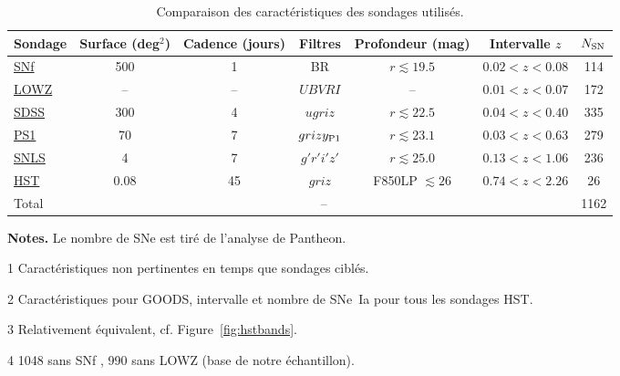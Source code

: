 \documentclass[../main/main.tex]{subfiles}
\begin{document}
\begin{table}[h]
    \centerfloat
    \begin{threeparttable}
        \caption{Comparaison des caractéristiques des sondages utilisés.}
        \label{tab:sondcomp}
        \begin{tabular}{lcccccc}
            \toprule
            Sondage              &
            Surface (deg$^2$)    & Cadence (jours)   & Filtres          &
            Profondeur (mag)     & Intervalle $z$    & $N_{\rm SN}$\\
            \midrule
            \hyperref[ssec:snf]{SNf} &
            500                      & 1                 & BR               &
            $r \lesssim 19.5$        & $0.02 < z < 0.08$ & 114\\
            \hyperref[ssec:lowz]{LOWZ}\tnote{1}            &
            --                       & --                & $UBVRI$          &
            --                       & $0.01 < z < 0.07$ & 172\\
            \hyperref[ssec:sdss]{SDSS}                     &
            300                      & 4                 & $ugriz$          &
            $r \lesssim 22.5$        & $0.04 < z < 0.40$ & 335\\
            \hyperref[ssec:ps1]{PS1}                      &
            70                       & 7                 & $grizy_{\rm P1}$ &
            $r \lesssim 23.1$        & $0.03 < z < 0.63$ & 279\\
            \hyperref[ssec:snls]{SNLS}                     &
            4                        & 7                 & $g'r'i'z'$       &
            $r \lesssim 25.0$        & $0.13 < z < 1.06$ & 236\\
            \hyperref[ssec:hst]{HST}\tnote{1}             &
            0.08                     & 45                & $griz$\tnote{2}  &
            F850LP $\lesssim 26$     & $0.74 < z < 2.26$ & 26\\
            \midrule
            Total & \multicolumn{5}{c}{--} & 1162\tnote{3}\\
            \bottomrule
        \end{tabular}
        \begin{tablenotes}[flushleft]
        \item \textbf{\hspace{-3.2pt}Notes.} Le nombre de SNe est tiré de
            l'analyse de Pantheon.
        \item [1] Caractéristiques non pertinentes en temps que sondages ciblés.
        \item [2] Caractéristiques pour GOODS, intervalle et nombre de SNe~Ia
            pour tous les sondages HST.
        \item [3] Relativement équivalent, cf. Figure~\ref{fig:hstbands}.
        \item [4] 1048 sans SNf \citep{scolnic2018}, 990 sans LOWZ (base de
            notre échantillon).
        \end{tablenotes}
    \end{threeparttable}
\end{table}
\end{document}
